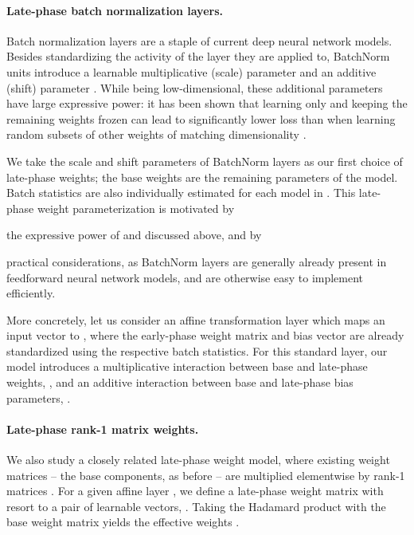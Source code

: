 \documentclass{article} \usepackage{iclr2021_conference,times}
\begin{document}
\paragraph{Late-phase batch normalization layers.} Batch normalization layers \citep[BatchNorm;][]{ioffe_batch_2015} are a staple of current deep neural network models. Besides standardizing the activity of the layer they are applied to, BatchNorm units introduce a learnable multiplicative (scale) parameter  and an additive (shift) parameter . While being low-dimensional, these additional parameters have large expressive power: it has been shown that learning only  and  keeping the remaining weights frozen can lead to significantly lower loss than when learning random subsets of other weights of matching dimensionality \citep[][]{frankle_training_2020,mudrakarta_k_2019}.


We take the scale and shift parameters of BatchNorm layers as our first choice of late-phase weights; the base weights are the remaining parameters of the model. Batch statistics are also individually estimated for each model in . This late-phase weight parameterization is motivated by
\begin{enumerate*}[label=(\itshape\roman*)]
  \item the expressive power of  and  discussed above, and by
  \item practical considerations, as BatchNorm layers are generally already present in feedforward neural network models, and are otherwise easy to implement efficiently.
\end{enumerate*}

More concretely, let us consider an affine transformation layer  which maps an input vector  to , where the early-phase weight matrix  and bias vector  are already standardized using the respective batch statistics. For this standard layer, our model introduces a multiplicative interaction between base and late-phase weights, , and an additive interaction between base and late-phase bias parameters, .

\paragraph{Late-phase rank-1 matrix weights.} We also study a closely related late-phase weight model, where existing weight matrices -- the base components, as before -- are multiplied elementwise by rank-1 matrices \citep[][]{wen_batchensemble_2020}. For a given affine layer , we define a late-phase weight matrix with resort to a pair of learnable vectors, . Taking the Hadamard product with the base weight matrix yields the effective weights .
\end{document}
